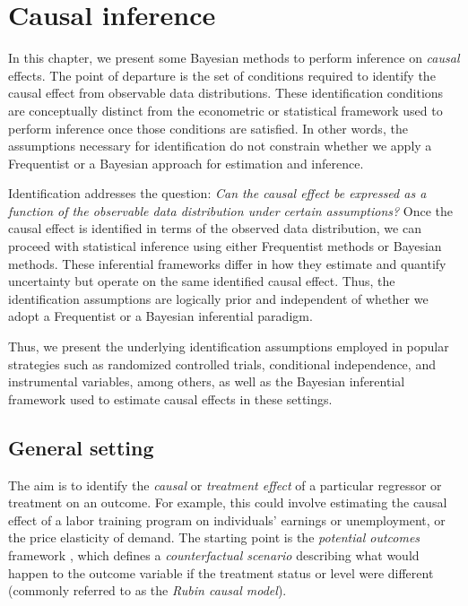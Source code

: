 \chapter{Causal inference}\label{chap12}

In this chapter, we present some Bayesian methods to perform inference on \textit{causal} effects. The point of departure is the set of conditions required to identify the causal effect from observable data distributions. These identification conditions are conceptually distinct from the econometric or statistical framework used to perform inference once those conditions are satisfied. In other words, the assumptions necessary for identification do not constrain whether we apply a Frequentist or a Bayesian approach for estimation and inference.

Identification addresses the question: \textit{Can the causal effect be expressed as a function of the observable data distribution under certain assumptions?} Once the causal effect is identified in terms of the observed data distribution, we can proceed with statistical inference using either Frequentist methods or Bayesian methods. These inferential frameworks differ in how they estimate and quantify uncertainty but operate on the same identified causal effect. Thus, the identification assumptions are logically prior and independent of whether we adopt a Frequentist or a Bayesian inferential paradigm.

Thus, we present the underlying identification assumptions employed in popular strategies such as randomized controlled trials, conditional independence, and instrumental variables, among others, as well as the Bayesian inferential framework used to estimate causal effects in these settings. 

\section{General setting}

The aim is to identify the \textit{causal} or \textit{treatment effect} of a particular regressor or treatment on an outcome. For example, this could involve estimating the causal effect of a labor training program on individuals’ earnings or unemployment, or the price elasticity of demand. The starting point is the \textit{potential outcomes} framework \cite{rubin1974}, which defines a \textit{counterfactual scenario} describing what would happen to the outcome variable if the treatment status or level were different (commonly referred to as the \textit{Rubin causal model}).


